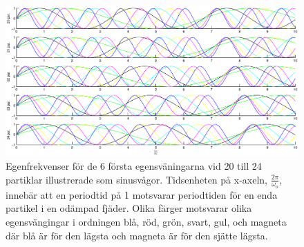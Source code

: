 \documentclass[12pt,a4paper]{article}
\begin{document}
		
		\begin{figure}
			\hspace{-1.5cm}\includegraphics[width=1.2\textwidth]{egenfrekvenser.eps}
			\caption{Egenfrekvenser för de 6 första egensväningarna vid 20 till 24 partiklar
			illustrerade som sinusvågor. Tidsenheten på x-axeln, $\frac{2\pi}{\omega_o}$,
			innebär att en periodtid på 1 motsvarar periodtiden för en enda partikel i en
			odämpad fjäder. Olika färger motsvarar olika egensvängingar i ordningen blå, röd,
			grön, svart, gul, och magneta där blå är för den lägsta och magneta är för den sjätte lägsta.}
			\label{egenf}
		\end{figure}
\end{document}
